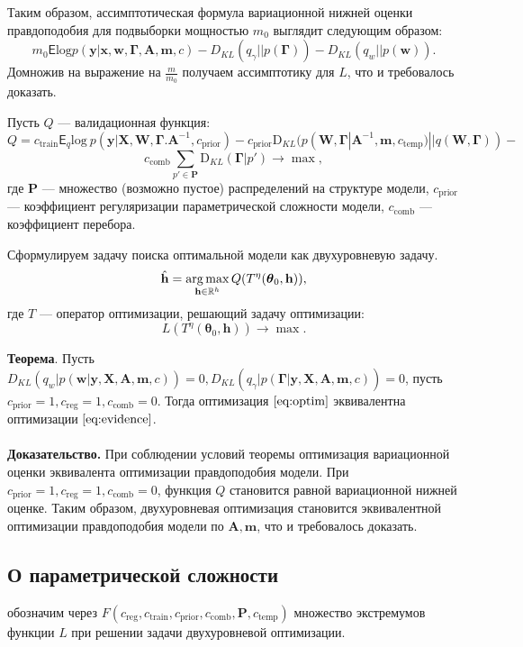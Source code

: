 Таким образом, ассимптотическая формула вариационной нижней оценки правдоподобия для подвыборки мощностью $m_0$ выглядит следующим образом:
\[
m_0\mathsf{E}\text{log} p(\mathbf{y}|{\mathbf{x}},\mathbf{w}, \boldsymbol{\Gamma}, \mathbf{A},\mathbf{m}, c) - {D_{KL}}(q_\gamma||p(\boldsymbol{\Gamma})) - {D_{KL}}(q_{w}||p(\mathbf{w})).
\]
Домножив на выражение на $\frac{m}{m_0}$ получаем ассимптотику для $L$, что и требовалось доказать.

Пусть $Q$ --- валидационная функция:
\[
Q = {c_\text{train}\mathsf{E}_q \text{log}~{p(\mathbf{y} | \mathbf{X}, \mathbf{W}, \boldsymbol{\Gamma}. \mathbf{A}^{-1}, c_{\text{prior}})}}
 - {c_\text{prior}\text{D}_{KL}(p(\mathbf{W}, \boldsymbol{\Gamma} |\mathbf{A}^{-1}, \mathbf{m}, c_{\text{temp}}) || q(\mathbf{W}, \boldsymbol{\Gamma}))} -\]
\[
{c_{\text{comb}}\sum_{p' \in \mathbf{P}} \text{D}_{KL}(\boldsymbol{\Gamma} | p')} \to \max, 
\]
где $\mathbf{P}$ --- множество (возможно пустое) распределений на структуре модели, $c_\text{prior}$ --- коэффициент регуляризации параметрической сложности модели, 
$c_{\text{comb}}$ --- коэффициент перебора.

Сформулируем задачу поиска оптимальной модели как двухуровневую задачу.
\begin{equation}
\label{eq:optim}
	\hat{\mathbf{h}} = \operatorname*{arg\,max}_{\mathbf{h} \in \mathbb{R}^h} Q( T^\eta(\boldsymbol{\theta}_0, \mathbf{h})),
\end{equation}
где $T$ --- оператор оптимизации, решающий задачу оптимизации:
\[
    L(T^\eta(\boldsymbol{\theta}_0, \mathbf{h})) \to \max.
\]


\textbf{Теорема}. Пусть $D_{KL}(q_w|p(\mathbf{w}|\mathbf{y}, \mathbf{X}, \mathbf{A},\mathbf{m}, c)) = 0, D_{KL}(q_\gamma|p(\boldsymbol{\Gamma}|\mathbf{y}, \mathbf{X}, \mathbf{A},\mathbf{m}, c)) = 0$, пусть $c_{\text{prior}} = 1, c_{\text{reg}} = 1, c_{\text{comb}} = 0$. Тогда оптимизация $\eqref{eq:optim}$ эквивалентна оптимизации $\eqref{eq:evidence}$.\\~\\
\textbf{Доказательство.} При соблюдении условий теоремы оптимизация вариационной оценки эквивалента оптимизации правдоподобия модели.
При $c_{\text{prior}} = 1, c_{\text{reg}} = 1, c_{\text{comb}} = 0$, функция $Q$ становится равной вариационной нижней оценке. 
Таким образом, двухуровневая оптимизация становится эквивалентной оптимизации правдоподобия модели по $\mathbf{A},\mathbf{m}$, что и требовалось доказать.


\subsection{О параметрической сложности}
обозначим через $F(c_{\text{reg}}, c_{\text{train}}, c_{\text{prior}}, c_{\text{comb}}, \mathbf{P}, c_{\text{temp}})$ множество экстремумов функции $L$ при решении задачи двухуровневой оптимизации.


